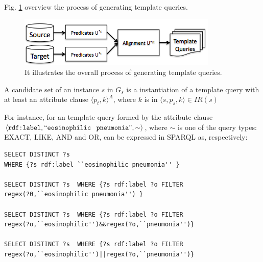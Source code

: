 Fig. \ref{fig:template} overview the process of generating template queries.
 
\begin{figure} [h]
\vspace{-10pt}
\centering
\includegraphics[scale=0.5]{p7.png}
\caption{It illustrates the overall process of generating template queries. } 
\vspace{-10pt}
\label{fig:template}
\end{figure}
 
\begin{definition}   A candidate set of an instance $s$ in $G_s$ is a instantiation of a template query with at least an attribute clause $\langle p_t,k \rangle^A$, where $k$ is in $\langle s,p_s,k \rangle \in IR(s)$
\end{definition} 

For instance, for an template query formed by the attribute clause $\langle\verb+rdf:label+,``\verb+eosinophilic+$  $\verb+pneumonia+",\sim\rangle$, where $\sim$ is one of the query types: EXACT, LIKE, AND and OR, can be expressed in SPARQL as, respectively: 

\begin{footnotesize} 
\begin{verbatim}
SELECT DISTINCT ?s  
WHERE {?s rdf:label ``eosinophilic pneumonia'' } 
 
SELECT DISTINCT ?s  WHERE {?s rdf:label ?o FILTER
regex(?0,``eosinophilic pneumonia'') } 

SELECT DISTINCT ?s  WHERE {?s rdf:label ?o FILTER 
regex(?o,``eosinophilic'')&&regex(?o,``pneumonia'')} 

SELECT DISTINCT ?s  WHERE {?s rdf:label ?o FILTER
regex(?o,``eosinophilic'')||regex(?o,``pneumonia'')} 
\end{verbatim}
\end{footnotesize}

